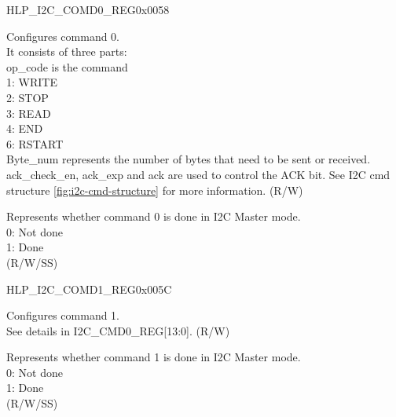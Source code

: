 \begin{register}{H}{LP\_I2C\_COMD0\_REG}{0x0058}\label{regdesc:LPI2CCOMD0REG}
%
%
%
\regnewline%
\begin{regdesc}\begin{reglist}
\label{fielddesc:LPI2CCOMMAND0}\item [LP\_I2C\_COMMAND0] Configures command 0. \\
It consists of three parts:\\
op\_code is the command\\
1: WRITE\\
2: STOP\\
3: READ\\
4: END\\
6: RSTART\\
Byte\_num represents the number of bytes that need to be sent or received.\\
ack\_check\_en, ack\_exp and ack are used to control the ACK bit. See I2C cmd structure \ref{fig:i2c-cmd-structure} for more information. (R/W)
\label{fielddesc:LPI2CCOMMAND0DONE}\item [LP\_I2C\_COMMAND0\_DONE] Represents whether command 0 is done in I2C Master mode.\\
0: Not done \\
1: Done \\ (R/W/SS)
\end{reglist}\end{regdesc}
\end{register}


\begin{register}{H}{LP\_I2C\_COMD1\_REG}{0x005C}\label{regdesc:LPI2CCOMD1REG}
%
%
%
\regnewline%
\begin{regdesc}\begin{reglist}
\label{fielddesc:LPI2CCOMMAND1}\item [LP\_I2C\_COMMAND1] Configures command 1.\\
See details in I2C\_CMD0\_REG[13:0]. (R/W)
\label{fielddesc:LPI2CCOMMAND1DONE}\item [LP\_I2C\_COMMAND1\_DONE] Represents whether command 1 is done in I2C Master mode.\\
0: Not done \\
1: Done \\ (R/W/SS)
\end{reglist}\end{regdesc}
\end{register}


